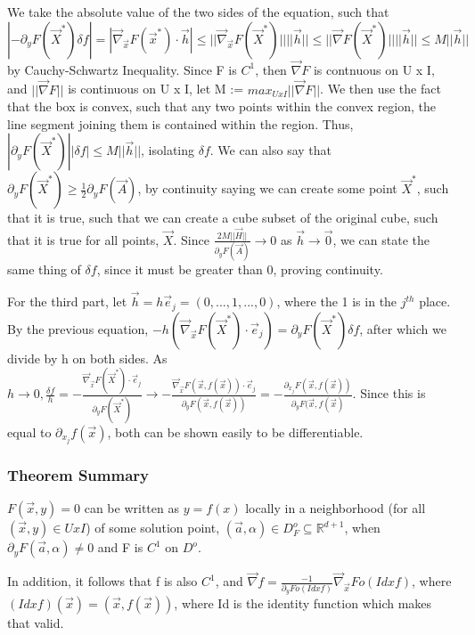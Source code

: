 \documentclass[11 pt, twoside]{article}
\begin{document}
We take the absolute value of the two sides of the equation, such that $|-\partial_yF(\vec{X}^*)\delta f| = |\vec{\nabla}_{\vec{x}}F(\vec{x}^*) \cdot \vec{h}| \leq ||\vec{\nabla}_{\vec{x}}F(\vec{X}^*)||||\vec{h}|| \leq ||\vec{\nabla}F(\vec{X}^*)||||\vec{h}|| \leq M||\vec{h}||$ by Cauchy-Schwartz Inequality. Since F is $C^1$, then $\vec{\nabla}F$ is contnuous on U x I, and $||\vec{\nabla}F||$ is continuous on U x I, let M := $max_{UxI}||\vec{\nabla}F||$. We then use the fact that the box is convex, such that any two points within the convex region, the line segment joining them is contained within the region. Thus, $|\partial_yF(\vec{X}^*)||\delta f| \leq M||\vec{h}||$, isolating $\delta f$. We can also say that $\partial_y F(\vec{X}^*) \geq \frac{1}{2}\partial_yF(\vec{A})$, by continuity saying we can create some point $\vec{X}^*$, such that it is true, such that we can create a cube subset of the original cube, such that it is true for all points, $\vec{X}$. Since $\frac{2M||\vec{H}||}{\partial_yF(\vec{A})} \to 0$ as $\vec{h} \to \vec{0}$, we can state the same thing of $\delta f$, since it must be greater than 0, proving continuity.

For the third part, let $\vec{h} = h\vec{e}_j = (0, ..., 1, ..., 0)$, where the 1 is in the $j^{th}$ place. By the previous equation, $-h(\vec{\nabla}_{\vec{x}}F(\vec{X}^*) \cdot \vec{e}_j) = \partial_yF(\vec{X}^*)\delta f$, after which we divide by h on both sides. As $h \to 0, \frac{\delta f}{h} = -\frac{\vec{\nabla}_{\vec{x}}F(\vec{X}^*) \cdot \vec{e}_j}{\partial_y F(\vec{X}^*)} \to -\frac{\vec{\nabla}_{\vec{x}}F(\vec{x}, f(\vec{x})) \cdot \vec{e}_j}{\partial_yF(\vec{x}, f(\vec{x}))} = -\frac{\partial_{x_j}F(\vec{x}, f(\vec{x}))}{\partial_yF(\vec{x}, f(\vec{x})}.$ Since this is equal to $\partial_{x_j}f(\vec{x})$, both can be shown easily to be differentiable.

\subsubsection{Theorem Summary}
$F(\vec{x}, y) = 0$ can be written as $y = f(x)$ locally in a neighborhood (for all $(\vec{x}, y) \in U x I$) of some solution point, $(\vec{a}, \alpha) \in D_F^o \subseteq \mathbb{R}^{d+1}$, when $\partial_yF(\vec{a}, \alpha) \neq 0$ and F is $C^1$ on $D^o$.

In addition, it follows that f is also $C^1$, and $\vec{\nabla}f = \frac{-1}{\partial_yF o (Id x f)}\vec{\nabla}_{\vec{x}}F o (Id x f)$, where $(Id x f)(\vec{x}) = (\vec{x}, f(\vec{x}))$, where Id is the identity function which makes that valid.
\end{document}
